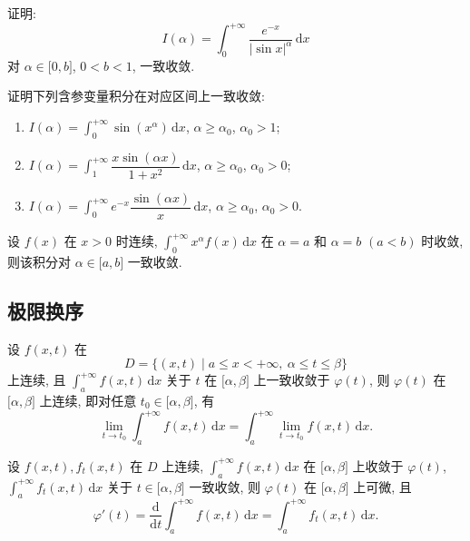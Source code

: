 \documentclass[../数学分析培优讲义.tex]{subfiles}
\begin{document}
\begin{example}
证明:
\[
    I(\alpha)=\int_0^{+\infty}\dfrac{e^{-x}}{|\sin x|^\alpha}\,\mathrm{d}x
\]
对 $\alpha\in\lbrack0,b\rbrack$, $0<b<1$, 一致收敛.
\end{example}
\exampleblank

\begin{example}
证明下列含参变量积分在对应区间上一致收敛:
\begin{enumerate}[label=(\arabic*)]
    \item $\displaystyle I(\alpha)=\int_0^{+\infty}\sin(x^\alpha)\,\mathrm{d}x$, $\alpha\geq\alpha_0$, $\alpha_0>1$;
    \item $\displaystyle I(\alpha)=\int_1^{+\infty}\dfrac{x\sin(\alpha x)}{1+x^2}\,\mathrm{d}x$, $\alpha\geq\alpha_0$, $\alpha_0>0$;
    \item $\displaystyle I(\alpha)=\int_0^{+\infty}e^{-x}\dfrac{\sin(\alpha x)}{x}\,\mathrm{d}x$, $\alpha\geq\alpha_0$, $\alpha_0>0$.
\end{enumerate}
\end{example}
\exampleblank

\begin{example}
设 $f(x)$ 在 $x>0$ 时连续, $\displaystyle\int_0^{+\infty}x^\alpha f(x)\,\mathrm{d}x$ 在 $\alpha=a$ 和 $\alpha=b$ $(a<b)$ 时收敛, 则该积分对 $\alpha\in\lbrack a,b\rbrack$ 一致收敛.
\end{example}
\exampleblank


\newpage

\subsection{极限换序}

\begin{theorem}
设 $f(x,t)$ 在
\[
    D=\{(x,t)\mid a\leq x<+\infty,\ \alpha\leq t\leq\beta\}
\]
上连续, 且 $\displaystyle\int_a^{+\infty}f(x,t)\,\mathrm{d}x$ 关于 $t$ 在 $\lbrack\alpha,\beta\rbrack$ 上一致收敛于 $\varphi(t)$, 则 $\varphi(t)$ 在 $\lbrack\alpha,\beta\rbrack$ 上连续, 即对任意 $t_0\in\lbrack\alpha,\beta\rbrack$, 有
\[
    \lim\limits_{t\to t_0}\int_a^{+\infty}f(x,t)\,\mathrm{d}x
    =\int_a^{+\infty}\lim\limits_{t\to t_0}f(x,t)\,\mathrm{d}x.
\]
\end{theorem}

\begin{theorem}
设 $f(x,t),f_t(x,t)$ 在 $D$ 上连续, $\displaystyle\int_a^{+\infty}f(x,t)\,\mathrm{d}x$ 在 $\lbrack\alpha,\beta\rbrack$ 上收敛于 $\varphi(t)$, $\displaystyle\int_a^{+\infty}f_t(x,t)\,\mathrm{d}x$ 关于 $t\in\lbrack\alpha,\beta\rbrack$ 一致收敛, 则 $\varphi(t)$ 在 $\lbrack\alpha,\beta\rbrack$ 上可微, 且
\[
    \varphi'(t)=\dfrac{\mathrm{d}}{\mathrm{d}t}\int_a^{+\infty}f(x,t)\,\mathrm{d}x
    =\int_a^{+\infty}f_t(x,t)\,\mathrm{d}x.
\]
\end{theorem}
\end{document}
